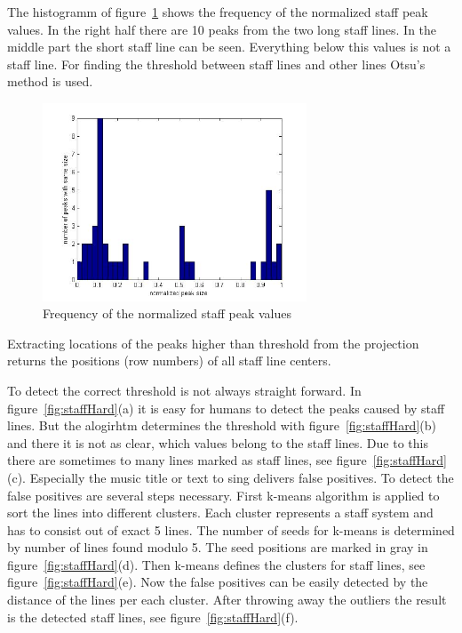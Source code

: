 The histogramm of figure~\ref{fig:staffHorizontalHist} shows the frequency of the normalized staff peak values. In the right half there are 10 peaks from the two long staff lines. In the middle part the short staff line can be seen. Everything below this values is not a staff line. For finding the threshold between staff lines and other lines Otsu's method \cite{url:matlab} is used. 

\begin{figure}[htbp]
    \centering
		\includegraphics[width=0.7\textwidth]{staffHorizontalHist.jpg}
		\caption{Frequency of the normalized staff peak values \label{fig:staffHorizontalHist}}
\end{figure}

Extracting locations of the peaks higher than threshold from the projection returns the positions (row numbers) of all staff line centers. 


To detect the correct threshold is not always straight forward. In figure~\ref{fig:staffHard}(a) it is easy for humans to detect the peaks caused by staff lines. But the alogirhtm determines the threshold with figure~\ref{fig:staffHard}(b) and there it is not as clear, which values belong to the staff lines. Due to this there are sometimes to many lines marked as staff lines, see figure~\ref{fig:staffHard}(c). Especially the music title or text to sing delivers false positives. To detect the false positives are several steps necessary. First k-means  algorithm is applied to sort the lines into different clusters. Each cluster represents a staff system and has to consist out of exact 5 lines. The number of seeds for k-means is determined by number of lines found modulo 5. The seed positions are marked in gray in figure~\ref{fig:staffHard}(d). Then k-means defines the clusters for staff lines, see figure~\ref{fig:staffHard}(e).
Now the false positives can be easily detected by the distance of the lines per each cluster. After throwing away the outliers the result is the detected staff lines, see figure~\ref{fig:staffHard}(f).



